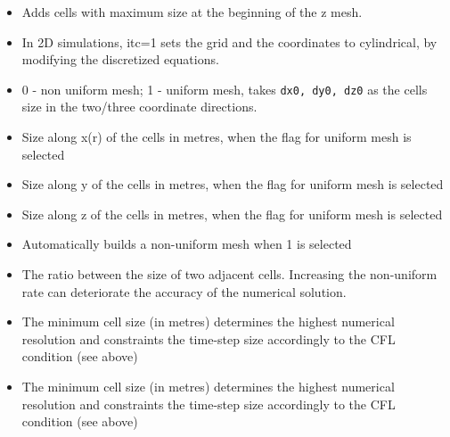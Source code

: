 \begin{itemize}
\item
{}
{Adds cells with maximum size  at the beginning of the z mesh.}

\item
{}
{In 2D simulations, itc=1 sets the grid and the coordinates to cylindrical,
by modifying the discretized equations.}

\item
{}
{0 - non uniform mesh; 1 - uniform mesh, takes {\tt dx0, dy0, dz0} as the
cells size in the two/three coordinate directions.}

\item
{}
{Size along x(r) of the cells in metres, when the flag for uniform mesh is selected}

\item
{}
{Size along y of the cells in metres, when the flag for uniform mesh is selected}

\item
{}
{Size along z of the cells in metres, when the flag for uniform mesh is selected}

\item
{}
{Automatically builds a non-uniform mesh when 1 is selected}

\item
{}
{The ratio between the size of two adjacent cells. Increasing the non-uniform rate can deteriorate the accuracy of the numerical solution.}

\item
{}
{The minimum cell size (in metres) determines the highest numerical resolution and constraints the time-step size accordingly to the CFL condition (see above)}

\item
{}
{The minimum cell size (in metres) determines the highest numerical resolution and constraints the time-step size accordingly to the CFL condition (see above)}


\end{itemize}
